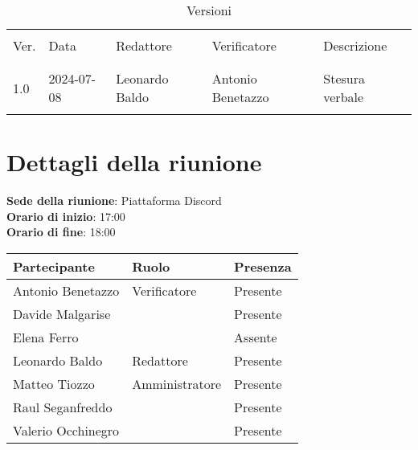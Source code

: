 \documentclass[italian,12pt]{article}
\begin{document}
\newcommand{\mySkip}[1][]{#1}



\newpage



\begin{table}[!h]
	\caption{Versioni}
	\footnotesize
	\begin{center}
		\begin{tabular}{ l l l l p{6cm} }
			\hline                                                                      \\[-2ex]
			Ver. & Data       & Redattore        & Verificatore       & Descrizione     \\
			\\[-2ex] \hline \\[-1.5ex]
			1.0  & 2024-07-08 & Leonardo Baldo   & Antonio Benetazzo  & Stesura verbale \\
			\\[-1.5ex] \hline
		\end{tabular}
	\end{center}
\end{table}

\newpage

\tableofcontents

\newpage

\section{Dettagli della riunione}

\textbf{Sede della riunione}: Piattaforma Discord\\
\textbf{Orario di inizio}: 17:00\\
\textbf{Orario di fine}: 18:00\\

\begin{flushleft}
	\begin{table}[!h]
		\begin{tabular}{ |l|l|l| }
			\hline
			\textbf{Partecipante} & \textbf{Ruolo} & \textbf{Presenza} \\
			\hline
			Antonio Benetazzo     & Verificatore   & Presente          \\
			Davide Malgarise      &                & Presente          \\
			Elena Ferro           &                & Assente           \\
			Leonardo Baldo        & Redattore      & Presente          \\
			Matteo Tiozzo         & Amministratore & Presente          \\
			Raul Seganfreddo      &                & Presente          \\
			Valerio Occhinegro    &                & Presente          \\
			\hline
		\end{tabular}
	\end{table}
\end{flushleft}
\end{document}
